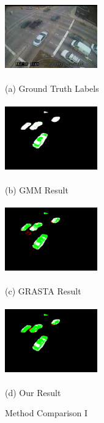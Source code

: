 \documentclass{article}
\begin{document}
\begin{figure}[t]

\begin{minipage}[b]{0.48\linewidth}
  \centering
  \centerline{\includegraphics[width=4cm, height=3cm]{Imgs/0112051333.jpg}}
  \centerline{(a) Ground Truth Labels}\medskip
\end{minipage}
\begin{minipage}[b]{0.48\linewidth}
  \centering
  \centerline{\includegraphics[width=4cm, height=3cm]{Imgs/0112051333_gmm_rwg.png}}
  \centerline{(b) GMM Result}\medskip
\end{minipage}

\begin{minipage}[b]{0.48\linewidth}
  \centering
  \centerline{\includegraphics[width=4cm, height =3cm]{Imgs/0112051333_grasta_rwg.png}}
  \centerline{(c) GRASTA Result}\medskip
\end{minipage}
\begin{minipage}[b]{0.48\linewidth}
  \centering
  \centerline{\includegraphics[width=4cm, height = 3cm]{Imgs/0112051333_rpca_rwg.png}}
  \centerline{(d) Our Result}\medskip
\end{minipage}

\caption{Method Comparison I}
\label{fig:methodComp1}
%
\end{figure}
\end{document}
